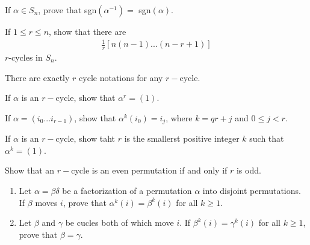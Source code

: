 \documentclass[12pt]{article}
\newenvironment{exercise}[2][Exercise]{\begin{trivlist}
\item[\hskip \labelsep {\bfseries #1}\hskip \labelsep {\bfseries #2.}]}
{\end{trivlist}}
\newenvironment{hint}[2][Hint]{\begin{trivlist}
    \item[\hskip \labelsep {\bfseries #1}\hskip \labelsep {\bfseries #2.}]}
    {\end{trivlist}}
\begin{document}
\begin{exercise}{1.11}

    If $\alpha\in S_n$, prove that sgn$(\alpha^{-1}) =$ sgn$(\alpha)$.
    
\end{exercise}



\begin{exercise}{1.12}

    If $1\leq r \leq n$, show that there are 
    \begin{align*}
        \frac{1}r [n(n-1)...(n-r+1)]
    \end{align*} 
    $r$-cycles in $S_n$.

    \begin{hint}{}
        There are exactly $r$ cycle notations for any $r-$cycle.
    \end{hint}

\end{exercise}

\begin{exercise}{1.13}

    \begin{enumerate}
        \item[(i)] If $\alpha$ is an $r-$cycle, show that $\alpha^r =(1)$.
        \begin{hint}{}
            If $\alpha=(i_0...i_{r-1})$, show that $\alpha^k(i_0) = i_j$, where $k=qr+j$ and $0\leq j < r$.
        \end{hint}
        \item[(ii)] If $\alpha$ is an $r-$cycle, show taht $r$ is the smallerst positive integer $k$ such that $\alpha^k=(1)$.
    \end{enumerate}

\end{exercise}


\begin{exercise}{1.14}

    Show that an $r-$cycle is an even permutation if and only if $r$ is odd.
\end{exercise}



\begin{exercise}{1.15}
    \begin{enumerate}
        \item[(i)] Let $\alpha = \beta\delta$ be a factorization of a permutation $\alpha$ into disjoint permutations. If $\beta$ moves $i$, prove that $\alpha^k(i) = \beta^k(i)$ for all $k \geq 1$.
        
        \item[(ii)] Let $\beta$ and $\gamma$ be cucles both of which move $i$. If $\beta^k(i) = \gamma^k(i)$ for all $k\geq 1$, prove that $\beta = \gamma$.
    \end{enumerate}
    
\end{exercise}
\end{document}
